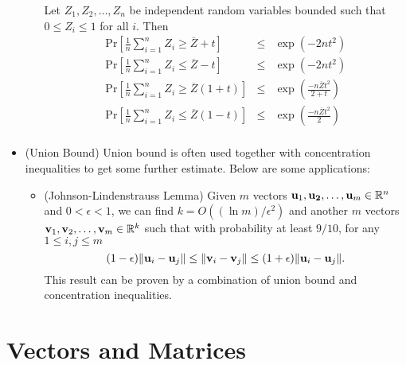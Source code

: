 \documentclass{article}
\begin{document}
\begin{itemize}
\begin{itemize}
Let $Z_1,Z_2,\ldots,Z_n$ be independent random variables bounded such that $0\le Z_i\le1$ for all $i$. Then
\begin{eqnarray}
\mathrm{Pr}[\frac{1}{n}\sum_{i=1}^nZ_i\ge\overline{Z}+t] & \le & \exp(-2nt^2) \\
\mathrm{Pr}[\frac{1}{n}\sum_{i=1}^nZ_i\le\overline{Z}-t] & \le & \exp(-2nt^2) \\
\mathrm{Pr}[\frac{1}{n}\sum_{i=1}^nZ_i\ge\overline{Z}(1+t)] & \le & \exp\left(\frac{-n\overline{Z}t^2}{2+t}\right) \\
\mathrm{Pr}[\frac{1}{n}\sum_{i=1}^nZ_i\le\overline{Z}(1-t)] & \le & \exp(\frac{-n\overline{Z}t^2}{2}) \\
\end{eqnarray}

\end{itemize}

\item (Union Bound) Union bound is often used together with concentration inequalities to get some further estimate. Below are some applications:

\begin{itemize}
\item (Johnson-Lindenstrauss Lemma) Given $m$ vectors $\mathbf{u}_1,\mathbf{u_2},\ldots,\mathbf{u}_m\in \mathbb{R}^n$ and $0<\epsilon<1$, we can find $k=O((\ln m)/\epsilon^2)$ and another $m$ vectors $\mathbf{v}_1,\mathbf{v}_2,\ldots,\mathbf{v}_m\in \mathbb{R}^k$ such that with probability at least $9/10$, for any $1\le i,j\le m$
\begin{equation}
(1-\epsilon)\Vert\mathbf{u}_i-\mathbf{u}_j\Vert\le\Vert\mathbf{v}_i-\mathbf{v}_j\Vert\le(1+\epsilon)\Vert\mathbf{u}_i-\mathbf{u}_j\Vert.
\end{equation}
This result can be proven by a combination of union bound and concentration inequalities.
\end{itemize}

\end{itemize}

\section{Vectors and Matrices}
\end{document}
